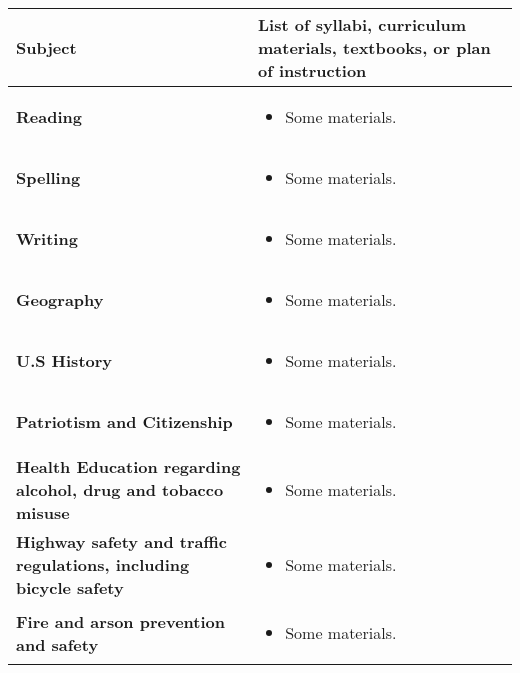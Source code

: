 \documentclass[10pt]{article}
\begin{document}
\noindent\begin{tabularx}{\textwidth}{ |p{2in}|X| }

\hline

{\bf Subject} & {\bf List of syllabi, curriculum materials, textbooks,
  or plan of instruction} \\

\hline

{\bf Reading} &
\begin{itemize}
\item Some materials.
\end{itemize} \\

\hline

{\bf Spelling} &
\begin{itemize}
\item Some materials.
\end{itemize} \\

\hline

{\bf Writing} &
\begin{itemize}
\item Some materials.
\end{itemize} \\

\hline

{\bf Geography} &
\begin{itemize}
\item Some materials.
\end{itemize} \\

\hline

{\bf U.S History} &
\begin{itemize}
\item Some materials.
\end{itemize} \\

\hline

{\bf Patriotism and Citizenship} &
\begin{itemize}
\item Some materials.
\end{itemize} \\

\hline

{\bf Health Education regarding alcohol, drug and tobacco misuse} &
\begin{itemize}
\item Some materials.
\end{itemize} \\

\hline

{\bf Highway safety and traffic regulations, including bicycle safety} &
\begin{itemize}
\item Some materials.
\end{itemize} \\

\hline

{\bf Fire and arson prevention and safety} &
\begin{itemize}
\item Some materials.
\end{itemize} \\

\hline

\end{tabularx}
\end{document}
